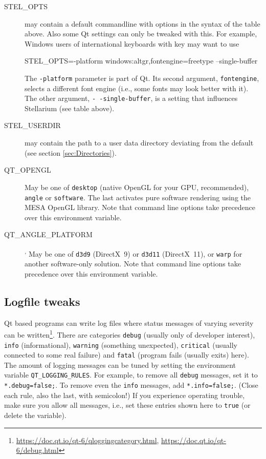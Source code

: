 \begin{description}
\item[{STEL\_OPTS}] may contain a default commandline with options in the syntax of the table above. Also some Qt settings can only be tweaked with this.
For example, Windows users of international keyboards with  key may want to use
\begin{commands}[\scriptsize]
STEL_OPTS=-platform windows:altgr,fontengine=freetype --single-buffer
\end{commands}
The \texttt{-platform} parameter is part of Qt. Its second argument, \texttt{fontengine}, selects a different font engine (i.e., some fonts may look better with it). 
The other argument, \texttt{-\,-single-buffer}, is a setting that influences Stellarium (see table above).
\item[{STEL\_USERDIR}] may contain the path to a user data directory
  deviating from the default (see section \ref{sec:Directories}).
\item[{QT\_OPENGL}] May be one of \texttt{desktop} (native OpenGL for your GPU, recommended),
  \texttt{angle} or \texttt{software}. The last activates pure software rendering using the MESA OpenGL library. Note that command line options take precedence over this environment variable.
\item[{QT\_ANGLE\_PLATFORM}]\textsuperscript{,} May be one of \texttt{d3d9} (DirectX~9) or \texttt{d3d11} (DirectX~11),
  or \texttt{warp} for another software-only solution. Note that command line options take precedence over this environment variable.
\end{description}

\subsection{Logfile tweaks}
\label{sec:Environment:Logfile}

Qt based programs can write log files where status messages of varying severity can be 
written\footnote{\scriptsize{\url{https://doc.qt.io/qt-6/qloggingcategory.html}, \url{https://doc.qt.io/qt-6/debug.html}}}. There are categories 
\texttt{debug} (usually only of developer interest), 
\texttt{info} (informational), 
\texttt{warning} (something unexpected), 
\texttt{critical} (usually connected to some real failure) and 
\texttt{fatal} (program fails (usually exits) here).
The amount of logging messages can be tuned by setting the environment variable \texttt{QT\_LOGGING\_RULES}. 
For example, to remove all \texttt{debug} messages, set it to \texttt{*.debug=false;}. 
To remove even the \texttt{info} messages, add \texttt{*.info=false;}. (Close each rule, also the last, with semicolon!)
If you experience operating trouble, make sure you allow all messages, i.e., set these entries shown here to \texttt{true} (or delete the variable).

